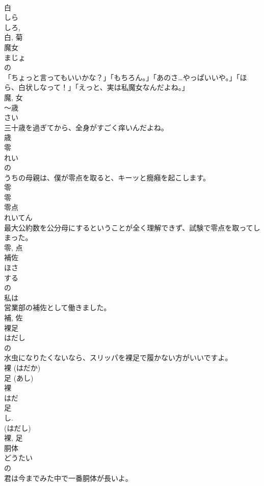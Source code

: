 \documentclass[8pt]{extreport}
\begin{document}
\begin{CJK}{UTF8}{min}
\\	白 
\\	しら 
\\	しろ, 
\\	白, 菊	
\\	魔女	
\\	まじょ	
\\	の 
\\	「ちょっと言ってもいいかな？」「もちろん。」「あのさ…やっぱいいや。」「ほら、白状しなって！」「えっと、実は私魔女なんだよね。」	
\\	魔, 女	
\\	〜歳	
\\	さい	
\\	三十歳を過ぎてから、全身がすごく痒いんだよね。	
\\	歳	
\\	零	
\\	れい	
\\	の 
\\	うちの母親は、僕が零点を取ると、キーッと癇癪を起こします。	
\\	零 
\\	零	
\\	零点	
\\	れいてん	
\\	最大公約数を公分母にするということが全く理解できず、試験で零点を取ってしまった。	
\\	零, 点	
\\	補佐	
\\	ほさ	
\\	する 
\\	の 
\\	私は
\\	営業部の補佐として働きました。	
\\	補, 佐	
\\	裸足	
\\	はだし	
\\	の 
\\	水虫になりたくないなら、スリッパを裸足で履かない方がいいですよ。	
\\	裸 (はだか) 
\\	足 (あし) 
\\	裸 
\\	はだ 
\\	足 
\\	し. 
\\	(はだし) 
\\	裸, 足	
\\	胴体	
\\	どうたい	
\\	の 
\\	君は今までみた中で一番胴体が長いよ。	

\end{CJK}
\end{document}
